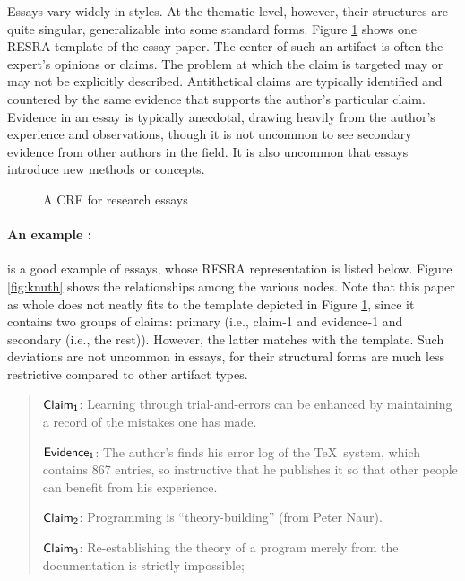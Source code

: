 \begin{itemize}
{Essays vary widely in styles. At the thematic level, however, their
structures are quite singular, generalizable into some standard forms.
Figure \ref{fig:expository} shows one RESRA template of the essay paper.
The center of such an artifact is often the expert's opinions or claims.
The problem at which the claim is targeted may or may not be explicitly
described. Antithetical claims are typically identified and countered by
the same evidence that supports the author's particular claim.  Evidence in
an essay is typically anecdotal, drawing heavily from the author's
experience and observations, though it is not uncommon to see secondary
evidence from other authors in the field.  It is also uncommon that essays
introduce new methods or concepts.

\begin{figure}[htb]
  \caption{A CRF for research essays}
  \label{fig:expository}
\end{figure}

\paragraph{An example :}

\cite{Knuth92} is a good example of essays, whose RESRA representation is
listed below. Figure \ref{fig:knuth} shows the relationships among the
various nodes. Note that this paper as whole does not neatly fits to the
template depicted in Figure \ref{fig:expository}, since it contains two
groups of claims: primary (i.e., {\sf claim-1\/} and {\sf evidence-1\/} and
secondary (i.e., the rest)). However, the latter matches with the template.
Such deviations are not uncommon in essays, for their structural forms are
much less restrictive compared to other artifact types.

\small
\begin{quotation}
  \noindent \( {\sf Claim_{1}} \): Learning through trial-and-errors can
  be enhanced by maintaining a record of the mistakes one has made.
  
  \noindent\( {\sf Evidence_{1}} \): The author's finds his error log of the
  \TeX\ system, which contains 867 entries, so instructive that he publishes
  it so that other people can benefit from his experience.

  \noindent\( {\sf Claim_{2}\/} \): Programming is ``theory-building'' (from Peter Naur).
  
  \noindent\( {\sf Claim_{3}} \): Re-establishing the theory of a program merely from
  the documentation is strictly impossible;
  

\end{quotation}}
\end{itemize}
